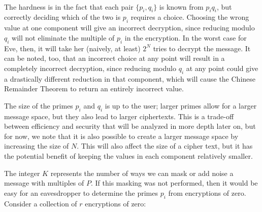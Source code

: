 \documentclass[11pt]{report}
\begin{document}
\

The hardness is in the fact that each pair $\{p_i,q_i\}$ is known from $p_iq_i$, but correctly deciding which of the two is $p_i$ requires a choice. Choosing the wrong value at one component will give an incorrect decryption, since reducing modulo $q_i$ will not eliminate the multiple of $p_i$ in the encryption. In the worst case for Eve, then, it will take her (naively, at least) $2^N$ tries to decrypt the message. It can be noted, too, that an incorrect choice at any point will result in a completely incorrect decryption, since reducing modulo $q_i$ at any point could give a drastically different reduction in that component, which will cause the Chinese Remainder Theorem to return an entirely incorrect value.

The size of the primes $p_i$ and $q_i$ is up to the user; larger primes allow for a larger message space, but they also lead to larger ciphertexts. This is a trade-off between efficiency and security that will be analyzed in more depth later on, but for now, we note that it is also possible to create a larger message space by increasing the size of $N$. This will also affect the size of a cipher text, but it has the potential benefit of keeping the values in each component relatively smaller.

The integer $K$ represents the number of ways we can mask or add noise a message with multiples of $P$. If this masking was not performed, then it would be easy for an eavesdropper to determine the primes $p_i$ from encryptions of zero. Consider a collection of $r$ encryptions of zero:

\
\end{document}
